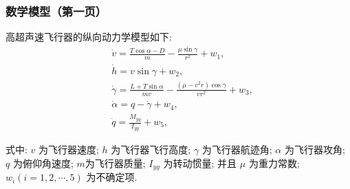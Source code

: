 \documentclass[
10pt,
aspectratio=43,
]{beamer}
\begin{document}
\begin{frame}
	\frametitle{数学模型（第一页）}
	高超声速飞行器的纵向动力学模型如下:
	\[
		\begin{aligned}
			 & \dot{v}=\frac{T \cos \alpha-D}{m}-\frac{\mu \sin \gamma}{r^2}+w_1,                             \\
			 & \dot{h}=v \sin \gamma+w_2,                                                                     \\
			 & \dot{\gamma}=\frac{L+T \sin \alpha}{m v}-\frac{\left(\mu-v^2 r\right) \cos \gamma}{v r^2}+w_3, \\
			 & \dot{\alpha}=q-\dot{\gamma}+w_4,                                                               \\
			 & \dot{q}=\frac{M_{y y}}{I_{y y}}+w_5,
		\end{aligned}
	\]

	式中: $v$ 为飞行器速度; $h$ 为飞行器飞行高度; $\gamma$ 为飞行器航迹角; $\alpha$ 为飞行器攻角; $q$ 为俯仰角速度; $m$为飞行器质量; $I_{y y}$ 为转动惯量; 并且 $\mu$ 为重力常数; $w_i(i=1,2, \cdots, 5)$ 为不确定项.

\end{frame}
\end{document}
